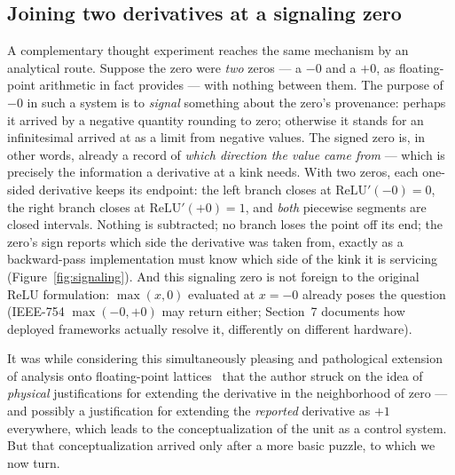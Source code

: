 \documentclass[11pt]{article}
\newcommand{\relu}{\mathrm{ReLU}}
\begin{document}
\subsection{Joining two derivatives at a signaling zero}

A complementary thought experiment reaches the same mechanism by an
analytical route. Suppose the zero were \emph{two} zeros --- a $-0$
and a $+0$, as floating-point arithmetic in fact provides --- with
nothing between them. The purpose of $-0$ in such a system is to
\emph{signal} something about the zero's provenance: perhaps it
arrived by a negative quantity rounding to zero; otherwise it stands
for an infinitesimal arrived at as a limit from negative values. The
signed zero is, in other words, already a record of \emph{which
direction the value came from} --- which is precisely the information
a derivative at a kink needs. With two zeros, each one-sided
derivative keeps its endpoint: the left branch closes at
$\relu'(-0) = 0$, the right branch closes at $\relu'(+0) = 1$, and
\emph{both} piecewise segments are closed intervals. Nothing is
subtracted; no branch loses the point off its end; the zero's sign
reports which side the derivative was taken from, exactly as a
backward-pass implementation must know which side of the kink it is
servicing (Figure~\ref{fig:signaling}). And this signaling zero is
not foreign to the original $\relu$ formulation: $\max(x, 0)$
evaluated at $x = -0$ already poses the question (IEEE-754
$\max(-0, +0)$ may return either; Section~7 documents how deployed
frameworks actually resolve it, differently on different hardware).

It was while considering this simultaneously pleasing and
pathological extension of analysis onto floating-point
lattices~\cite{apostol2} that
the author struck on the idea of \emph{physical} justifications for
extending the derivative in the neighborhood of zero --- and possibly
a justification for extending the \emph{reported} derivative as
$+1$ everywhere, which leads to the conceptualization of the unit as
a control system. But that conceptualization arrived only after a
more basic puzzle, to which we now turn.
\end{document}
